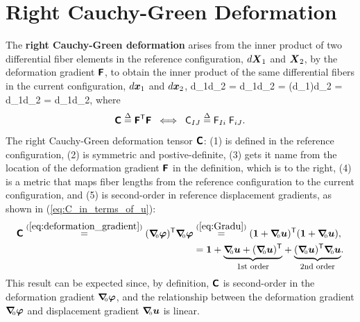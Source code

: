 \section{Right Cauchy-Green Deformation}
The {\bf right Cauchy-Green deformation} arises from the inner product of two differential fiber elements in the reference configuration, $d\mbox{\boldmath $X$}_1$ and $\mbox{\boldmath $X$}_2$, by the deformation gradient $\mbox{\sffamily\bfseries F}$, to obtain the inner product of the same differential fibers in the current configuration, $d\mbox{\boldmath $x$}_1$ and $d\mbox{\boldmath $x$}_2$,
\be
d\vx_1\cdot d\vx_2 = d\vx_1\transpose d\vx_2 = (\tFbold d\vX_1)\transpose \tFbold d\vX_2 = d\vX_1\transpose \;\tFbold\transpose \tFbold \;d\vX_2 = d\vX_1\transpose \;\tCbold \;d\vX_2,
\ee
where
\begin{equation}
 \mbox{\sffamily\bfseries C} 
 \stackrel{\Delta}{=} 
 \mbox{\sffamily\bfseries F}^{\mbox{\scriptsize \sffamily T}} \mbox{\sffamily\bfseries F}
 \;\; \Longleftrightarrow \;\;
 \mathsf C_{IJ} 
 \stackrel{\Delta}{=} 
 \mathsf F_{Ii} \; \mathsf F_{iJ}. 
\end{equation}
The right Cauchy-Green deformation tensor $\mbox{\sffamily\bfseries C}$: (1) is defined in the reference configuration, (2) is symmetric and postive-definite, (3) gets it name from the location of the deformation gradient $\mbox{\sffamily\bfseries F}$ in the definition, which is to the right, (4) is a metric that maps fiber lengths from the reference configuration to the current configuration, and (5) is second-order in reference displacement gradients, as shown in (\ref{eq:C_in_terms_of_u}):
\begin{align}
\tCbold \overset{(\ref{eq:deformation_gradient})}{=} 
(\Grad \vvarphi)\transpose \Grad \vvarphi 
    &\overset{(\ref{eq:Gradu})}{=} 
    (\vid + \Grad \vu)\transpose (\vid + \Grad \vu), \\
    &= 
    \vid 
    + 
    \underset{\mbox{\footnotesize 1st order}}{\underbrace{\Grad \vu 
                                 + (\Grad \vu)\transpose}}
    + 
    \underset{\mbox{\footnotesize 
    2nd order}}{\underbrace{(\Grad \vu)\transpose\Grad \vu}}.
    \label{eq:C_in_terms_of_u}
\end{align}
This result can be expected since, by definition, $\mbox{\sffamily\bfseries C}$ is second-order in the deformation gradient $\mbox{\boldmath $\nabla$}_{\hspace{-1mm}\mbox{\tiny 0}}\mbox{\boldmath $\varphi$}$, and the relationship between the deformation gradient $\mbox{\boldmath $\nabla$}_{\hspace{-1mm}\mbox{\tiny 0}}\mbox{\boldmath $\varphi$}$ and displacement gradient $\mbox{\boldmath $\nabla$}_{\hspace{-1mm}\mbox{\tiny 0}}\mbox{\boldmath $u$}$ is linear.

